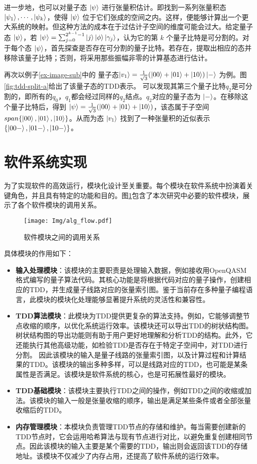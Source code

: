 进一步地，也可以对量子态 $\ket{\psi}$ 进行张量积估计。即找到一系列张量积态 $\ket{\psi_1},\cdots, \ket{\psi_k}$，使得 $\ket{\psi}$ 位于它们张成的空间之内。这样，便能够计算出一个更大系统的映射。但这种方法的成本在于过估计子空间的维度可能会过大。给定量子态 $\ket{\psi}$，若 $\ket{\psi}=\sum_{j=0}^{2^{k-1}-1}{\ket{j}\ket{\phi}\ket{\gamma_j}}$，认为它的第 $k$ 个量子比特是可分割的。对于每个态 $\ket{\psi}$，首先探查是否存在可分割的量子比特。若存在，提取出相应的态并移除该量子比特；否则，将采用那些振幅非零的计算基态进行估计。
\begin{example}
    \label{ex-approx}
    再次以例子\ref{ex-image-sub}中的
    量子态$\ket{v_1}=\frac{1}{\sqrt{3}}(\ket{00}+\ket{01}+\ket{10})\ket{-}$ 为例。图 \ref{fig:tdd-split-a}给出了该量子态的TDD表示。
可以发现其第三个量子比特$q_2$是可分割的，即所有的$q_0$，$q_1$都会经过同样的$q_2$结点。$q_2$对应的量子态为 $\ket{-}$。在移除这个量子比特后，得到 $\ket{\psi}=\frac{1}{\sqrt{3}}(\ket{00}+\ket{01}+\ket{10})$，该态属于子空间 $span\{\ket{00},\ket{01},\ket{10}\}$。从而为态 $\ket{v_1}$ 找到了一种张量积的近似表示 $\{\ket{00-},\ket{01-},\ket{10-}\}$。
\end{example}

\section{软件系统实现}
为了实现软件的高效运行，模块化设计至关重要。每个模块在软件系统中扮演着关键角色，并且具有特定的功能和目的。图\ref{fig-flow}包含了本次研究中必要的软件模块，展示了各个软件模块的调用关系。
\begin{figure}[htbp]
    \texttt{[image: Img/alg\_flow.pdf]}
    \caption{软件模块之间的调用关系}
    \label{fig-flow}
\end{figure}
具体模块的作用如下：
\begin{itemize}
    \item \textbf{输入处理模块}：该模块的主要职责是处理输入数据，例如接收用OpenQASM格式编写的量子算法代码。其核心功能是将根据代码对应的量子操作，创建相应的TDD，并生成量子线路对应的张量索引图。鉴于当前存在多种量子编程语言，此模块的模块化处理能够显著提升系统的灵活性和兼容性。
    \item \textbf{TDD算法模块}：此模块为TDD提供更复杂的算法支持。例如，它能够调整节点收缩的顺序，以优化系统运行效率。该模块还可以导出TDD的树状结构图。树状结构图的导出功能则有助于用户更好地理解和分析TDD的结构。此外，它还能执行其他高级功能，如检验TDD是否存在于特定子空间中，对TDD进行分割。
    因此该模块的输入是量子线路的张量索引图，以及计算过程和计算结果的TDD。该模块的输出多种多样，可以是线路对应的TDD，也可能是某条属性是否满足。该模块是软件系统的核心，也是可拓展性最好的模块。
    \item \textbf{TDD基础模块}：该模块主要执行TDD之间的操作，例如TDD之间的收缩或加法。该模块的输入一般是张量收缩的顺序，输出是满足某些条件或者全部张量收缩后的TDD。
    \item \textbf{内存管理模块}：本模块负责管理TDD节点的存储和维护。每当需要创建新的TDD节点时，它会运用哈希算法与现有节点进行对比，以避免重复创建相同节点。因此该模块的输入主要是某个需要的TDD，输出则会返回该TDD的存储地址。该模块不仅减少了内存占用，还提高了软件系统的运行效率。

\end{itemize}

